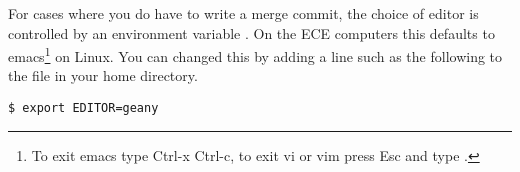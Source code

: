 For cases where you do have to write a merge commit, the choice of
editor is controlled by an environment variable
. On the ECE computers this defaults to emacs\footnote{To
exit emacs type Ctrl-x Ctrl-c, to exit vi or vim press Esc and type
.}  on Linux. You can changed this by adding a line such as
the following to the  file in your home
directory.

\begin{verbatim}
$ export EDITOR=geany
\end{verbatim}
